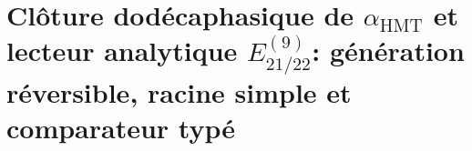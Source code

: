 \begin{HMTScientificOwnerSubordinated}

\end{HMTScientificOwnerSubordinated}
\begingroup
\let\HMTRecoveredOriginalPart\part
\let\part\section
\begin{HMTScientificOwnerSubordinated}


\end{HMTScientificOwnerSubordinated}
\let\part\HMTRecoveredOriginalPart
\endgroup

\HMTFlushCurrentChapter
\chapter{Clôture dodécaphasique de \texorpdfstring{\(\alpha_{\mathrm{HMT}}\)}{alpha HMT} et lecteur analytique \texorpdfstring{\(E_{21/22}^{(9)}\)}{E21/22 d'ordre 9}: génération réversible, racine simple et comparateur typé}%
\begingroup
\renewcommand{\chapter}[2][]{}%
%
\endgroup


\HMTFlushCurrentChapter
\chapter{Construction interne de \texorpdfstring{\(i=\sqrt{-1}\)}{i=sqrt(-1)} par l'opérateur de rotation \texorpdfstring{\(J\)}{J}: identité \texorpdfstring{\(J^2=-I\)}{J2=-I} et géométrie elliptique de phase}%
\begingroup
\renewcommand{\chapter}[2][]{}%
%
\endgroup

